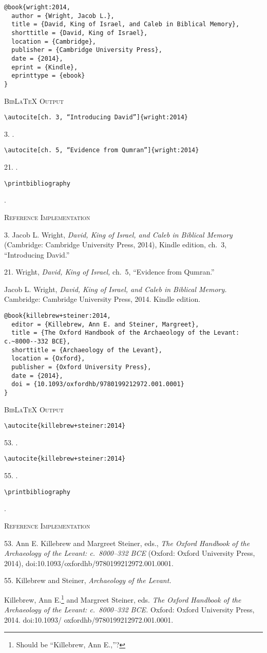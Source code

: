 \documentclass[a4paper]{article}
\newcommand\citetest[5]{%
  {\textsc{BibLaTeX Output}\par
   \nobreak
   \texttt{\textbackslash autocite[#2]\{#5\}}\par
   \color{biblatex-colour}
   #1. \cite[#2]{#5}.\par
   \color{black}
   \texttt{\textbackslash autocite[#4]\{#5\}}\par
   \color{biblatex-colour}
   #3. \cite[#4]{#5}.\par
   \color{black}
   \texttt{\textbackslash printbibliography}\par
   \color{biblatex-colour}
   \hangindent\bibindent\bibentrycite{#5}.\par}}
\newcommand\citetestnp[3]{%
  {\textsc{BibLaTeX Output}\par
   \nobreak
   \texttt{\textbackslash autocite\{#3\}}\par
   \color{biblatex-colour}
   #1. \cite{#3}.\par
   \color{black}
   \texttt{\textbackslash autocite\{#3\}}\par
   \color{biblatex-colour}
   #2. \cite{#3}.\par
   \color{black}
   \texttt{\textbackslash printbibliography}\par
   \color{biblatex-colour}
   \hangindent\bibindent\bibentrycite{#3}.\par}}
\newenvironment{refimp}{%
  \begin{minipage}{\linewidth}
    \setlength{\parskip}{1ex}
    \textsc{Reference Implementation}\par
    \nobreak
    \color{reference-colour}
}{\end{minipage}}
\begin{document}
\begin{lstlisting}
@book{wright:2014,
  author = {Wright, Jacob L.},
  title = {David, King of Israel, and Caleb in Biblical Memory},
  shorttitle = {David, King of Israel},
  location = {Cambridge},
  publisher = {Cambridge University Press},
  date = {2014},
  eprint = {Kindle},
  eprinttype = {ebook}
}
\end{lstlisting}

\citetest{3}{ch.~3, \mkbibquote{Introducing David}}{21}{ch.~5,
\mkbibquote{Evidence from Qumran}}{wright:2014}

\begin{refimp}
  3. Jacob L. Wright, \emph{David, King of Israel, and Caleb in Biblical
  Memory} (Cambridge: Cambridge University Press, 2014), Kindle edition,
  ch.~3, “Introducing David.”

  21. Wright, \emph{David, King of Israel,} ch.~5, “Evidence from Qumran.”

  \hangindent\bibindent Jacob L. Wright, \emph{David, King of Israel, and
  Caleb in Biblical Memory.} Cambridge: Cambridge University Press, 2014.
  Kindle edition.
\end{refimp}

\begin{lstlisting}
@book{killebrew+steiner:2014,
  editor = {Killebrew, Ann E. and Steiner, Margreet},
  title = {The Oxford Handbook of the Archaeology of the Levant: c.~8000--332 BCE},
  shorttitle = {Archaeology of the Levant},
  location = {Oxford},
  publisher = {Oxford University Press},
  date = {2014},
  doi = {10.1093/oxfordhb/9780199212972.001.0001}
}
\end{lstlisting}

\citetestnp{53}{55}{killebrew+steiner:2014}

\begin{refimp}
  53. Ann E. Killebrew and Margreet Steiner, eds., \emph{The Oxford Handbook
  of the Archaeology of the Levant: c.~8000–332 BCE} (Oxford: Oxford
  University Press, 2014), doi:10.1093/oxfordhb/9780199212972.001.0001.

  55. Killebrew and Steiner, \emph{Archaeology of the Levant.}

  \hangindent\bibindent Killebrew, Ann E.\footnote{Should be “Killebrew, Ann
  E.,”?} and Margreet Steiner, eds. \emph{The Oxford Handbook of the
  Archaeology of the Levant: c.~8000–332 BCE.} Oxford: Oxford University
  Press, 2014. doi:10.1093/ oxfordhb/9780199212972.001.0001.
\end{refimp}
\end{document}
